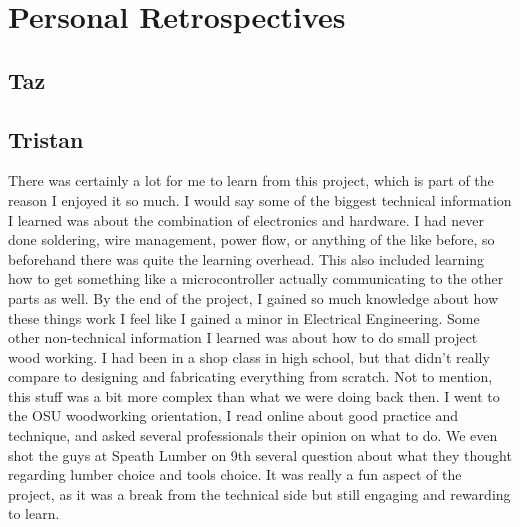 \documentclass[onecolumn, draftclsnofoot,10pt, compsoc]{IEEEtran}
\begin{document}
\section{Personal Retrospectives}
\subsection{Taz}
\subsection{Tristan}
There was certainly a lot for me to learn from this project, which is part of the reason I enjoyed it so much.
I would say some of the biggest technical information I learned was about the combination of electronics and hardware.
I had never done soldering, wire management, power flow, or anything of the like before, so beforehand there was quite the learning overhead.
This also included learning how to get something like a microcontroller actually communicating to the other parts as well.
By the end of the project, I gained so much knowledge about how these things work I feel like I gained a minor in Electrical Engineering.
Some other non-technical information I learned was about how to do small project wood working.
I had been in a shop class in high school, but that didn't really compare to designing and fabricating everything from scratch.
Not to mention, this stuff was a bit more complex than what we were doing back then.
I went to the OSU woodworking orientation, I read online about good practice and technique, and asked several professionals their opinion on what to do.
We even shot the guys at Speath Lumber on 9th several question about what they thought regarding lumber choice and tools choice.
It was really a fun aspect of the project, as it was a break from the technical side but still engaging and rewarding to learn.
\end{document}
